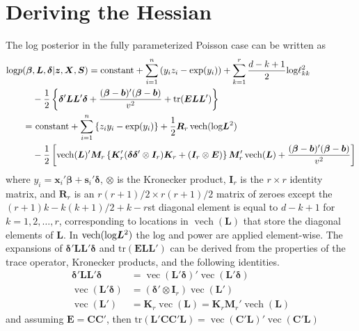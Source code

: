 \documentclass[12pt]{article}
\newcommand{\Appendix}
{%
\def\thesection{Appendix~\Alph{section}:}
\def\thesubsection{A.\arabic{subsection}}
}
\def\log{\hbox{log}}
\DeclareMathOperator{\vect}{vec}
\DeclareMathOperator{\vech}{vech}
\begin{document}
\section{Deriving the Hessian}\label{sec:hess}
\begin{appendix}
\Appendix    %
\renewcommand{\theequation}{B.\arabic{equation}}
\setcounter{equation}{0}

The log posterior in the fully parameterized Poisson case can be written as
\begin{align*}
\log p(\bm{\beta}&, \bm{L}, \bm{\delta}|\bm{z}, \bm{X}, \bm{S}) = \mathrm{constant}+ \sum_{i=1}^n\left(y_iz_i - \exp(y_i)\right) + \sum_{k=1}^r \frac{d - k + 1}{2}\log\ell_{kk}^2\\
& - \frac{1}{2}\left\{\bm{\delta}'\bm{L}\bm{L}'\bm{\delta}+\frac{(\bm{\beta} - \bm{b})'(\bm{\beta} - \bm{b})}{v^2} + \mathrm{tr}(\bm{E}\bm{L}\bm{L}')\right\}\\ 
=&\ \mathrm{constant} + \sum_{i=1}^n \left\{z_iy_i - \exp(y_i)\right\} + \frac{1}{2}\bm{R}_r\vech(\log\bm{L}^2)\\
&  -\frac{1}{2}\left[\vech(\bm{L})'\bm{M}_r\left\{\bm{K}_r'(\bm{\delta}\bm{\delta}'\otimes \bm{I}_r)\bm{K}_r + (\bm{I}_r\otimes \bm{E})\right\}\bm{M}_r'\vech(\bm{L})+\frac{(\bm{\beta}-\bm{b})'(\bm{\beta}-\bm{b})}{v^2}\right]
\end{align*}
where $y_i = \bm{x}_i'\bm{\beta} + \bm{s}_i'\bm{\delta}$, $\otimes$ is the Kronecker product, $\bm{I}_r$ is the $r\times r$ identity matrix, and $\bm{R}_r$ is an $r(r+1)/2\times r(r+1)/2$ matrix of zeroes except the $(r + 1)k - k(k+1)/2 + k - r$st diagonal element is equal to $d - k + 1$ for $k=1, 2, \dots, r$, corresponding to locations in $\vech(\bm{L})$ that store the diagonal elements of $\bm{L}$. In $\vech(\log\bm{L}^2)$ the log and power are applied element-wise. The expansions of $\bm{\delta}'\bm{L}\bm{L}'\bm{\delta}$ and $\mathrm{tr}(\bm{E}\bm{L}\bm{L}')$ can be derived from the properties of the trace operator, Kronecker products, and the following identities.
\begin{align*}
\bm{\delta}'\bm{L}\bm{L}'\bm{\delta}& = \vect(\bm{L}'\bm{\delta})'\vect(\bm{L}'\bm{\delta})\\ 
\vect(\bm{L}'\bm{\delta})& = (\bm{\delta}'\otimes \bm{I}_r)\vect(\bm{L}')\\
\vect(\bm{L}')& = \bm{K}_r\vect(\bm{L}) = \bm{K}_r\bm{M}_r'\vech(\bm{L})
\end{align*}
and assuming $\bm{E} = \bm{C}\bm{C}'$, then $\mathrm{tr}(\bm{L'}\bm{C}\bm{C}'\bm{L}) = \vect(\bm{C}'\bm{L})'\vect(\bm{C}'\bm{L})$

\end{appendix}
\end{document}
